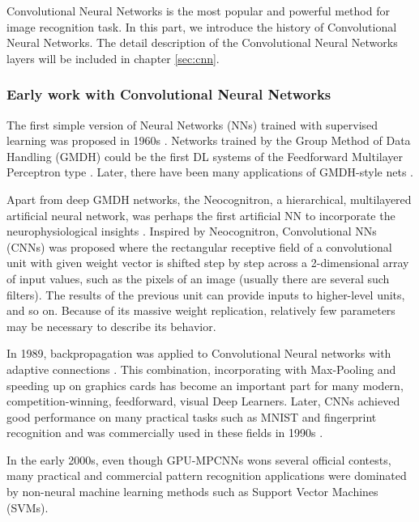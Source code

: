 Convolutional Neural Networks \cite{lecun1998gradient} is the most popular and powerful method for image recognition task. In this part, we introduce the history of Convolutional Neural Networks. The detail description of the Convolutional Neural Networks layers will be included in chapter \ref{sec:cnn}.

\subsubsection{Early work with Convolutional Neural Networks}
The first simple version of Neural Networks (NNs) trained with supervised learning was proposed in 1960s  \cite{rosenblatt1958perceptron}\cite{rosenblatt1962principles}. Networks trained by the Group Method of Data Handling (GMDH) could be the first DL systems of the Feedforward Multilayer Perceptron type \cite{ivakhnenko1965cybernetic}\cite{Schmidhuber14}. Later, there have been many applications of GMDH-style
nets \cite{farlow1984self} \cite{ikeda1976sequential} \cite{kondo2008multi} \cite{witczak2006gmdh}.

Apart from deep GMDH networks, the Neocognitron, a hierarchical, multilayered artificial neural network, was perhaps the first artificial NN to incorporate the
neurophysiological insights \cite{fukushima1980neocognitron}. Inspired by Neocognitron, Convolutional NNs (CNNs) was proposed where the rectangular receptive field of a convolutional unit with given weight vector is shifted step by step across a 2-dimensional array of input values, such as the pixels of an image (usually there are several such filters). The results of the previous unit can provide inputs to higher-level units, and so on. Because of its massive weight replication,  relatively few parameters may be necessary to describe its behavior.

In 1989, backpropagation \cite{lecun1989backpropagation}\cite{lecun1998gradient} was applied to Convolutional Neural networks with adaptive connections \cite{lecun1989backpropagation}. This combination, incorporating with Max-Pooling and speeding up on graphics cards has become an important part for  many modern, competition-winning, feedforward, visual Deep Learners. Later, CNNs achieved good performance on many practical tasks such as MNIST and fingerprint recognition and was commercially used in these fields in 1990s \cite{baldi1993neural} \cite{le1990handwritten}. 

In the early 2000s, even though GPU-MPCNNs wons several official contests, many practical and commercial pattern recognition applications were dominated by non-neural machine learning methods such as Support Vector Machines (SVMs).

